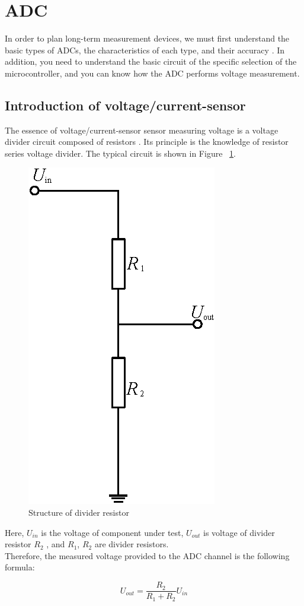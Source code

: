 \section{ADC}
\label{sec:ADC}
In order to plan long-term measurement devices, we must first understand the basic types of ADCs, the characteristics of each type, and their accuracy \cite{daboczi2012adc}. In addition, you need to understand the basic circuit of the specific selection of the microcontroller, and you can know how the ADC performs voltage measurement.

\subsection{Introduction of voltage/current-sensor}
\label{sec:Introduction of voltage/current-sensor}


The essence of voltage/current-sensor sensor measuring voltage is a voltage divider circuit composed of resistors \cite{martins2011teaching}. Its principle is the knowledge of resistor series voltage divider. The typical circuit is shown in Figure ~\ref{fig:2.1}. 
\begin{figure}[h]
	\centering
	\includegraphics{grafiken/2.1.eps}
	\caption{Structure of divider resistor} 
	\label{fig:2.1}
\end{figure}
Here, $U_{in}$ is the voltage of component under test, $U_{out}$ is voltage of divider resistor $R_{2}$ , and $R_{1}$, $R_{2}$ are divider resistors.
\\
Therefore, the measured voltage provided to the ADC channel is the following formula:
\\
\begin{center} 
\begin{equation}
 U_{out} = \frac{R_{2}}{R_{1}+R_{2}} U_{in}  
\end{equation}
\end{center}

